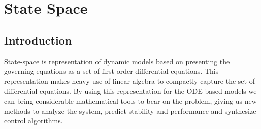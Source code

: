 \chapter{State Space}\label{c:statespace}
\section{Introduction}
State-space is representation of dynamic models based on presenting the governing equations as a set of first-order differential equations.  This representation makes heavy use of linear algebra to compactly capture the set of differential equations.  By using this representation for the ODE-based models we can bring considerable mathematical tools to bear on the problem, giving us new methods to analyze the system, predict stability and performance and synthesize control algorithms.


